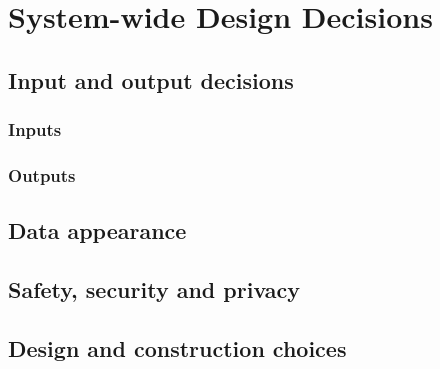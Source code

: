 \chapter{System-wide Design Decisions}
\label{chp:system-wide}

\section{Input and output decisions}

\subsection{Inputs}

\subsection{Outputs}

\section{Data appearance}

\section{Safety, security and privacy}

\section{Design and construction choices}